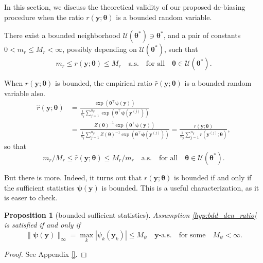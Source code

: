 \documentclass[11pt]{article}
\numberwithin{equation}{section}
\numberwithin{theorem}{section}
\def\faty{\boldsymbol{y}}
\def\fattheta{\boldsymbol{\theta}}
\def\fatpsi{\boldsymbol{\psi}}
\newtheorem{prop}[lem]{Proposition}
\theoremstyle{definition}
\theoremstyle{remark}
\begin{document}
In this section, we discuss the theoretical validity of our proposed de-biasing procedure when the ratio $r(\faty;\fattheta)$ is a bounded random variable.

\begin{assumption} \label{hyp:bdd_den_ratio}
There exist a bounded neighborhood $\mathcal{U}(\fattheta^*) \ni \fattheta^*$, and a pair of constants $0 < m_r \leq M_r < \infty$, possibly depending on $\mathcal{U}(\fattheta^*)$, such that
\begin{equation}
m_r \leq r(\faty;\fattheta) \leq M_r \quad\text{a.s.} \quad\text{for all}\quad \fattheta \in \mathcal{U}(\fattheta^*).
\end{equation}
\end{assumption}

\noindent
When $r(\faty;\fattheta)$ is bounded, the empirical ratio $\hat r(\faty;\fattheta)$ is a bounded random variable also.
\begin{equation}
\begin{aligned}
\hat r(\faty;\fattheta)
&= \frac{\exp\left( \fattheta^\top \fatpsi(\faty) \right)}{\frac{1}{n_y} \sum_{j=1}^{n_y} \exp\left( \fattheta^\top \fatpsi(\faty^{(j)}) \right)} \\
&= \frac{Z(\fattheta)^{-1} \exp\left( \fattheta^\top \fatpsi(\faty) \right)}{\frac{1}{n_y} \sum_{j=1}^{n_y} Z(\fattheta)^{-1} \exp\left( \fattheta^\top \fatpsi(\faty^{(j)}) \right)}
= \frac{r(\faty;\fattheta)}{\frac{1}{n_y} \sum_{j=1}^{n_y} r(\faty^{(j)};\fattheta)},
\end{aligned}
\end{equation}
so that
\begin{equation}
m_r/M_r \leq \hat r(\faty;\fattheta) \leq M_r/m_r \quad\text{a.s.}\quad \text{for all} \quad \fattheta \in \mathcal{U}(\fattheta^*).
\end{equation}

\noindent
But there is more.
Indeed, it turns out that $r(\faty;\fattheta)$ is bounded if and only if the sufficient statistics $\fatpsi(\faty)$ is bounded.
This is a useful characterization, as it is easer to check.

\begin{prop}[bounded sufficient statistics]
Assumption \ref{hyp:bdd_den_ratio} is satisfied if and only if
\begin{equation}
\|\fatpsi(\faty)\|_\infty = \max_k |\psi_k(\faty_k)| \leq M_\psi \quad\faty\text{-a.s.}\quad\text{for some}\quad M_\psi < \infty.
\end{equation}
\end{prop}
\begin{proof}
See Appendix \ref{}.
\end{proof}
\end{document}

